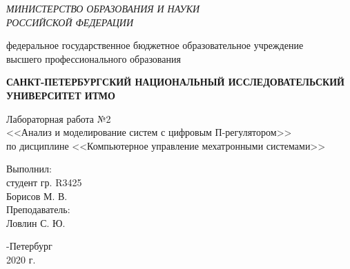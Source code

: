 \begin{titlepage}
	\begin{center}
		\textit{МИНИСТЕРСТВО ОБРАЗОВАНИЯ И НАУКИ\\
			РОССИЙСКОЙ ФЕДЕРАЦИИ}
		\vspace{1ex}
		
		федеральное государственное бюджетное образовательное учреждение\\
		высшего профессионального образования
		\vspace{1ex}
		
		\textbf{САНКТ-ПЕТЕРБУРГСКИЙ НАЦИОНАЛЬНЫЙ ИССЛЕДОВАТЕЛЬСКИЙ УНИВЕРСИТЕТ ИТМО}
		\vspace{13ex}
		
		Лабораторная работа №2\\
		<<Анализ и моделирование систем с цифровым П-регулятором>>\\
		по дисциплине <<Компьютерное управление мехатронными системами>>\\
	\end{center}
	\vspace{15em}
	\begin{flushright}
		\noindent
		Выполнил:\\
		студент гр. R3425\\
		Борисов М. В.\\
		Преподаватель:\\
		Ловлин С. Ю.
	\end{flushright}
	\vfill
	\begin{center}
		-Петербург\\
		2020 г.\\
	\end{center}
\end{titlepage}